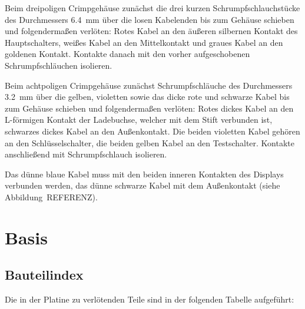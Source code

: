 \documentclass[paper=a4, open=any]{scrbook}
\begin{document}
				Beim dreipoligen Crimpgehäuse zunächst die drei kurzen Schrumpfschlauchstücke des Durchmessers \SI{6,4}{\milli\metre} über die losen Kabelenden bis zum Gehäuse schieben und folgendermaßen verlöten: Rotes Kabel an den äußeren silbernen Kontakt des Hauptschalters, weißes Kabel an den Mittelkontakt und graues Kabel an den goldenen Kontakt. Kontakte danach mit den vorher aufgeschobenen Schrumpfschläuchen isolieren.

				Beim achtpoligen Crimpgehäuse zunächst Schrumpfschläuche des Durchmessers \SI{3,2}{\milli\metre} über die gelben, violetten sowie das dicke rote und schwarze Kabel bis zum Gehäuse schieben und folgendermaßen verlöten: Rotes dickes Kabel an den L-förmigen Kontakt der Ladebuchse, welcher mit dem Stift verbunden ist, schwarzes dickes Kabel an den Außenkontakt. Die beiden violetten Kabel gehören an den Schlüsselschalter, die beiden gelben Kabel an den Testschalter. Kontakte anschließend mit Schrumpfschlauch isolieren.
				
				Das dünne blaue Kabel muss mit den beiden inneren Kontakten des Displays verbunden werden, das dünne schwarze Kabel mit dem Außenkontakt (siehe Abbildung~REFERENZ).				

				\newpage
		\section{Basis}
			\subsection*{Bauteilindex}

				Die in der Platine zu verlötenden Teile sind in der folgenden Tabelle aufgeführt:
\end{document}
